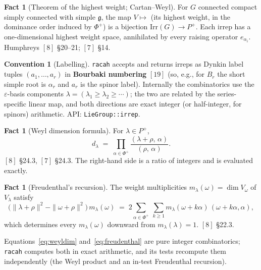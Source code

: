 \documentclass[11pt,a4paper]{article}
\theoremstyle{plain}
\theoremstyle{definition}
\newtheorem{fact}[theorem]{Fact}
\newtheorem{convention}[theorem]{Convention}
\newcommand{\g}{\mathfrak{g}}
\newcommand{\Irr}{\mathrm{Irr}}
\newcommand{\code}[1]{\texttt{#1}}
\begin{document}
\begin{fact}[Theorem of the highest weight; Cartan--Weyl]\label{fact:hw}
For $G$ connected compact simply connected with simple $\g$, the map
$V\mapsto$ (its highest weight, in the dominance order induced by $\Phi^+$)
is a bijection $\Irr(G)\to P^+$. Each irrep has a one-dimensional highest
weight space, annihilated by every raising operator $e_{\alpha_i}$.
Humphreys $[8]$ \S20--21; $[7]$ \S14.
\end{fact}

\begin{convention}[Labelling]\label{conv:labelling}
\code{racah} accepts and returns irreps as Dynkin label tuples
$(a_1,\dots,a_r)$ in \textbf{Bourbaki numbering} $[19]$ (so, e.g., for $B_r$
the short simple root is $\alpha_r$ and $a_r$ is the spinor label). Internally
the combinatorics use the $\varepsilon$-basis components
$\lambda=(\lambda_1\ge\lambda_2\ge\cdots)$; the two are related by the
series-specific linear map, and both directions are exact integer (or
half-integer, for spinors) arithmetic. API: \code{LieGroup::irrep}.
\end{convention}

\begin{fact}[Weyl dimension formula]\label{fact:weyldim}
For $\lambda\in P^+$,
\begin{equation}\label{eq:weyldim}
  d_\lambda \;=\; \prod_{\alpha\in\Phi^+}
    \frac{(\lambda+\rho,\,\alpha)}{(\rho,\,\alpha)} .
\end{equation}
$[8]$ \S24.3, $[7]$ \S24.3. The right-hand side is a ratio of integers and is
evaluated exactly.
\end{fact}

\begin{fact}[Freudenthal's recursion]\label{fact:freudenthal}
The weight multiplicities $m_\lambda(\omega)=\dim V_\omega$ of $V_\lambda$
satisfy
\begin{equation}\label{eq:freudenthal}
  \bigl( \|\lambda+\rho\|^2 - \|\omega+\rho\|^2 \bigr)\, m_\lambda(\omega)
  \;=\; 2 \sum_{\alpha\in\Phi^+}\ \sum_{k\ge 1}
        m_\lambda(\omega+k\alpha)\,(\omega+k\alpha,\alpha),
\end{equation}
which determines every $m_\lambda(\omega)$ downward from
$m_\lambda(\lambda)=1$. $[8]$ \S22.3.
\end{fact}

Equations~\eqref{eq:weyldim} and~\eqref{eq:freudenthal} are pure integer
combinatorics; \code{racah} computes both in exact arithmetic, and its tests
recompute them independently (the Weyl product and an in-test Freudenthal
recursion).
\end{document}
